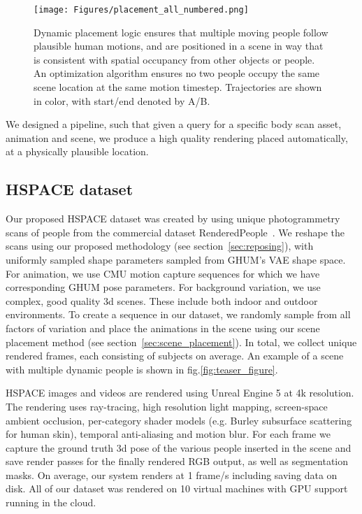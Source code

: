 \documentclass[10pt,twocolumn,letterpaper]{article}
\begin{document}
\begin{figure}[!htbp]
\begin{center}
    \texttt{[image: Figures/placement\_all\_numbered.png]}
\end{center}
\vspace{-4mm}
\caption{\small Dynamic placement logic ensures that multiple moving people follow plausible human motions, and are positioned in a scene in way that is consistent with spatial occupancy from other objects or people. An optimization algorithm ensures no two people occupy the same scene location at the same motion timestep. Trajectories are shown in color, with start/end denoted by A/B.}
\label{fig:placement}
\end{figure}


 We designed a pipeline, such that given a query for a specific body scan asset, animation and scene, we produce a high quality rendering placed automatically, at a physically plausible location.


\subsection{HSPACE dataset}

 Our proposed HSPACE dataset was created by using  unique photogrammetry scans of people from the commercial dataset RenderedPeople~\cite{renderpeople}. We reshape the scans using our proposed methodology (see section~\ref{sec:reposing}), with  uniformly sampled shape parameters sampled from GHUM's VAE shape space. For animation, we use  CMU motion capture sequences for which we have corresponding GHUM pose parameters. For background variation, we use  complex, good quality 3d scenes. These include both indoor and outdoor environments. To create a sequence in our dataset, we randomly sample from all factors of variation and place the animations in the scene using our scene placement method (see section~\ref{sec:scene_placement}). In total, we collect  unique rendered frames, each consisting of  subjects on average. An example of a scene with multiple dynamic people is shown in fig.\ref{fig:teaser_figure}.


 HSPACE images and videos are rendered using Unreal Engine 5 at 4k resolution. The rendering uses ray-tracing, high resolution light mapping, screen-space ambient occlusion, per-category shader models (e.g. Burley subsurface scattering for human skin), temporal anti-aliasing and motion blur. For each frame we capture the ground truth 3d pose of the various people inserted in the scene and save render passes for the finally rendered RGB output, as well as segmentation masks. On average, our system renders at 1 frame/s including saving data on disk. All of our dataset was rendered on 10 virtual machines with GPU support running in the cloud.
\end{document}

